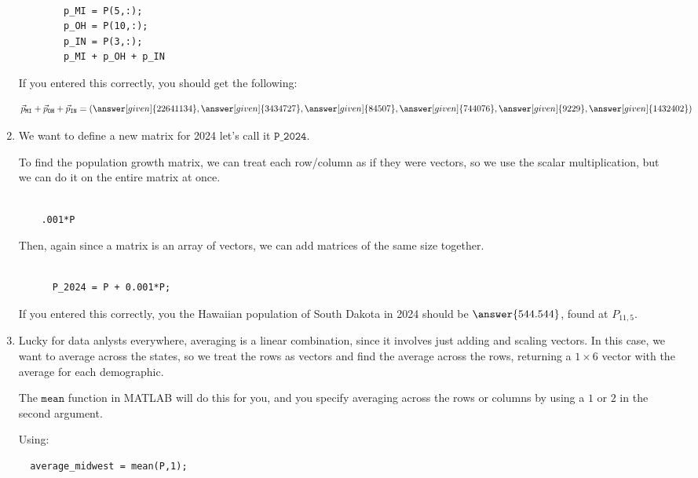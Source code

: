 \documentclass{ximera}
\begin{document}
\begin{example}
\begin{solution}
\begin{enumerate}
      \begin{Verbatim}
      
        p_MI = P(5,:);
        p_OH = P(10,:);
        p_IN = P(3,:);
        p_MI + p_OH + p_IN

      \end{Verbatim}

      If you entered this correctly, you should get the following:

    \[
    \vec{p}_{\texttt{MI}} + \vec{p}_{\texttt{OH}} + \vec{p}_{\texttt{IN}} = (\answer[given]{22641134},\answer[given]{3434727},\answer[given]{84507},\answer[given]{744076},\answer[given]{9229},\answer[given]{1432402})
    \]
  \item We want to define a new matrix for 2024 let's call it $\texttt{P\_2024}$.
  
  To find the population growth matrix, we can treat each row/column as if they were vectors, so we use the scalar multiplication, but we can do it on the entire matrix at once. 

  \begin{verbatim}
  
    .001*P

  \end{verbatim}

  Then, again since a matrix is an array of vectors, we can add matrices of the same size together.

    \begin{Verbatim}

      P_2024 = P + 0.001*P;

    \end{Verbatim}

    If you entered this correctly, you the Hawaiian population of South Dakota in 2024 should be $\answer{544.544}$, found at $P_{11,5}$.

\item Lucky for data anlysts everywhere, averaging is a linear combination, since it involves just adding and scaling vectors. In this case, we want to average across the states, so we treat the rows as vectors and find the average across the rows, returning a $1\times 6$ vector with the average for each demographic. 

The $\texttt{mean}$ function in MATLAB will do this for you, and you specify averaging across the rows or columns by using a $1$ or $2$ in the second argument. 

Using: 

\begin{verbatim}
  average_midwest = mean(P,1);
\end{verbatim}


\end{enumerate}
\end{solution}
\end{example}
\end{document}
